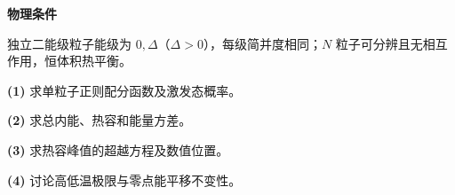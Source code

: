 \textbf{物理条件}\par 独立二能级粒子能级为 \(0,\Delta\)（\(\Delta>0\)），每级简并度相同；\(N\) 粒子可分辨且无相互作用，恒体积热平衡。
\par\noindent\textbf{(1)} 求单粒子正则配分函数及激发态概率。
\par\noindent\textbf{(2)} 求总内能、热容和能量方差。
\par\noindent\textbf{(3)} 求热容峰值的超越方程及数值位置。
\par\noindent\textbf{(4)} 讨论高低温极限与零点能平移不变性。
